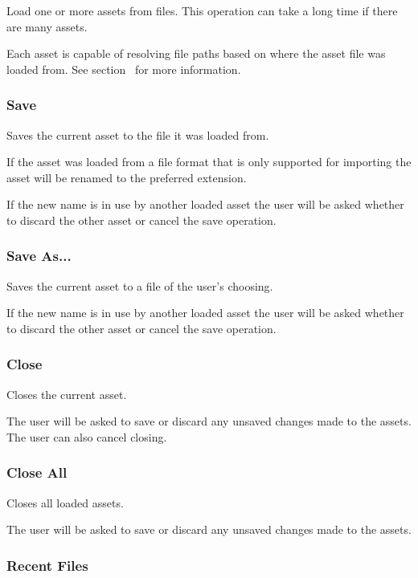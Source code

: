\documentclass[10pt, a4paper, titlepage, oneside]{article}
\begin{document}
Load one or more assets from files. This operation can take a long time if there are many assets.

Each asset is capable of resolving file paths based on where the asset file was loaded from. See section~ for more information.

\subsubsection{Save}

Saves the current asset to the file it was loaded from.

If the asset was loaded from a file format that is only supported for importing the asset will be renamed to the preferred extension.

If the new name is in use by another loaded asset the user will be asked whether to discard the other asset or cancel the save operation.

\subsubsection{Save As...}

Saves the current asset to a file of the user's choosing.

If the new name is in use by another loaded asset the user will be asked whether to discard the other asset or cancel the save operation.

\subsubsection{Close}

Closes the current asset.

The user will be asked to save or discard any unsaved changes made to the assets. The user can also cancel closing.

\subsubsection{Close All}

Closes all loaded assets.

The user will be asked to save or discard any unsaved changes made to the assets.

\subsubsection{Recent Files}
\end{document}
